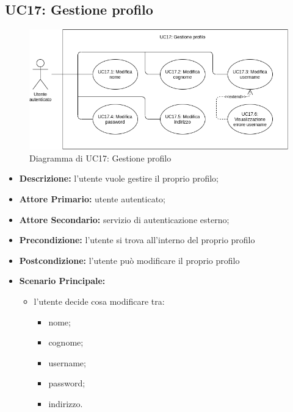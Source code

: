 \subsection{UC17: Gestione profilo}
\label{sec:UC17}
\begin{figure}[!ht]
    \caption{Diagramma di UC17: Gestione profilo}
    \vspace{10px}
    \includegraphics[scale=0.5]{../../../Images/AnalisiRequisiti/UC17}
    \centering
\end{figure}

\begin{itemize}
    \item \textbf{Descrizione:} l'utente vuole gestire il proprio profilo;
    \item \textbf{Attore Primario:} utente autenticato;
    \item \textbf{Attore Secondario:} servizio di autenticazione esterno;
    \item \textbf{Precondizione:} l'utente si trova all'interno del proprio profilo
    \item \textbf{Postcondizione:} l'utente può modificare il proprio profilo
    \item \textbf{Scenario Principale:}
          \begin{itemize}
              \item  l'utente decide cosa modificare tra:
                    \begin{itemize}
                        \item nome;
                        \item cognome;
                        \item username;
                        \item password;
                        \item indirizzo.
                    \end{itemize}
          \end{itemize}
\end{itemize}



